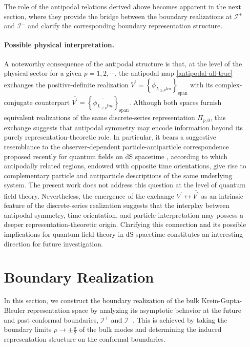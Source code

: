 \documentclass[aps,twocolumn,nofootinbib]{revtex4}
\begin{document}
The role of the antipodal relations derived above becomes apparent in the next section, where they provide the bridge between the boundary realizations at ${\mathcal{I}}^+$ and ${\mathcal{I}}^-$ and clarify the corresponding boundary representation structure.

\paragraph{Possible physical interpretation.} A noteworthy consequence of the antipodal structure is that, at the level of the physical sector for a given $p=1,2,\cdots$, the antipodal map \eqref{antipodal-all-true} exchanges the positive-definite realization $V^\prime = \left\{ \phi^{}_{L^{}_{\geqslant p}lm} \right\}_{\mathrm{span}}$ with its complex-conjugate counterpart $\overline{V^\prime} = \left\{ \overline{\phi^{}_{L^{}_{\geqslant p}lm}} \right\}_{\mathrm{span}}$. Although both spaces furnish equivalent realizations of the same discrete-series representation $\Pi_{p,0}$, this exchange suggests that antipodal symmetry may encode information beyond its purely representation-theoretic role. In particular, it bears a suggestive resemblance to the observer-dependent particle-antiparticle correspondence proposed recently for quantum fields on dS spacetime \cite{GazeauEPL}, according to which antipodally related regions, endowed with opposite time orientations, give rise to complementary particle and antiparticle descriptions of the same underlying system. The present work does not address this question at the level of quantum field theory. Nevertheless, the emergence of the exchange $V^\prime \longleftrightarrow \overline{V^\prime}$ as an intrinsic feature of the discrete-series realization suggests that the interplay between antipodal symmetry, time orientation, and particle interpretation may possess a deeper representation-theoretic origin. Clarifying this connection and its possible implications for quantum field theory in dS spacetime constitutes an interesting direction for future investigation.


\section{Boundary Realization}\label{Sec. Boundary}

In this section, we construct the boundary realization of the bulk Krein-Gupta-Bleuler representation space by analyzing its asymptotic behavior at the future and past conformal boundaries, ${\mathcal{I}}^+$ and ${\mathcal{I}}^-$. This is achieved by taking the boundary limits $\rho\longrightarrow\pm\frac{\pi}{2}$ of the bulk modes and determining the induced representation structure on the conformal boundaries.
\end{document}
